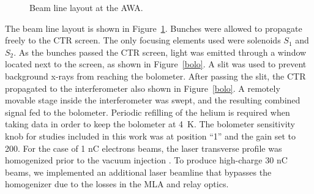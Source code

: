 \begin{figure}%
	\centering
	\begin{tikzpicture}[scale=0.8, text=black]
	
	\end{tikzpicture}	
	\caption{Beam line layout at the AWA.}
	\label{beamline}
\end{figure}
The beam line layout is shown in Figure~\ref{beamline}. 
Bunches were allowed to propagate freely to the 
CTR screen. The only focusing elements used were solenoids $S_1$ and
$S_2$. As the bunches passed the CTR screen, light was
emitted through a window located next to the screen, 
as shown in Figure~\ref{bolo}. A slit was used to prevent
background x-rays from reaching the bolometer.
After passing the slit, the CTR propagated to the 
interferometer also shown in Figure~\ref{bolo}.   
A remotely movable stage inside the interferometer was swept, 
and the resulting combined signal fed to the bolometer. 
Periodic refilling of the helium is required when taking data in order
to keep the bolometer at \SI{4}{K}. The bolometer sensitivity knob for studies included in this work was at position ``1'' and
the gain set to 200.
For the case of 1 nC electrons beams, the laser transverse profile was homogenized prior to the vacuum injection \cite{PhysRevAccelBeams.20.103404}.
To produce high-charge 30 nC beams, we implemented an additional laser beamline that bypasses the homogenizer due to the losses in the 
MLA and relay optics.

